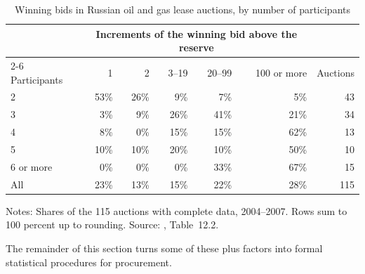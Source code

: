 \begin{table}[htbp]
\centering
\caption{Winning bids in Russian oil and gas lease auctions, by number of participants}\label{tab:13-mm-russia}
\small
\begin{tabular}{@{}lrrrrrr@{}}
\toprule
 & \multicolumn{5}{c}{Increments of the winning bid above the reserve} & \\
\cmidrule(lr){2-6}
Participants & 1 & 2 & 3--19 & 20--99 & 100 or more & Auctions\\
\midrule
2 & 53\% & 26\% & 9\% & 7\% & 5\% & 43\\
3 & 3\% & 9\% & 26\% & 41\% & 21\% & 34\\
4 & 8\% & 0\% & 15\% & 15\% & 62\% & 13\\
5 & 10\% & 10\% & 20\% & 10\% & 50\% & 10\\
6 or more & 0\% & 0\% & 0\% & 33\% & 67\% & 15\\
\addlinespace
All & 23\% & 13\% & 15\% & 22\% & 28\% & 115\\
\bottomrule
\end{tabular}

\smallskip
\begin{minipage}{0.86\textwidth}\footnotesize
Notes: Shares of the 115 auctions with complete data, 2004--2007. Rows sum to 100 percent up to rounding. Source:
\citet{MarshallMarx2012}, Table~12.2.
\end{minipage}
\end{table}

The remainder of this section turns some of these plus factors into formal statistical procedures for
procurement.

